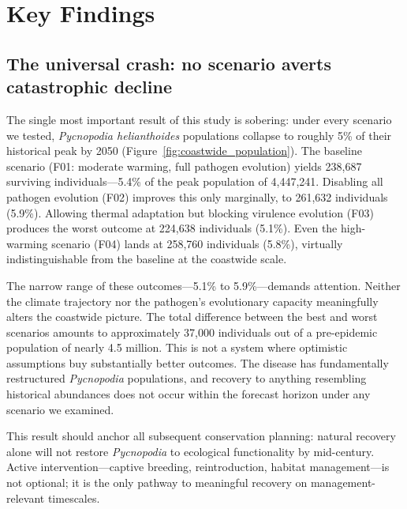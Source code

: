 
\section{Key Findings}
\label{sec:key_findings}

\subsection{The universal crash: no scenario averts catastrophic decline}
\label{sec:findings_crash}

The single most important result of this study is sobering: under every scenario we
tested, \textit{Pycnopodia helianthoides} populations collapse to roughly 5\% of their
historical peak by 2050 (Figure~\ref{fig:coastwide_population}). The baseline
scenario (F01: moderate warming, full pathogen evolution) yields 238,687 surviving
individuals---5.4\% of the peak population of 4,447,241. Disabling all pathogen
evolution (F02) improves this only marginally, to 261,632 individuals (5.9\%).
Allowing thermal adaptation but blocking virulence evolution (F03) produces the
worst outcome at 224,638 individuals (5.1\%). Even the high-warming scenario (F04)
lands at 258,760 individuals (5.8\%), virtually indistinguishable from the baseline
at the coastwide scale.

The narrow range of these outcomes---5.1\% to 5.9\%---demands attention. Neither the
climate trajectory nor the pathogen's evolutionary capacity meaningfully alters the
coastwide picture. The total difference between the best and worst scenarios amounts
to approximately 37,000 individuals out of a pre-epidemic population of nearly 4.5
million. This is not a system where optimistic assumptions buy substantially better
outcomes. The disease has fundamentally restructured \textit{Pycnopodia} populations,
and recovery to anything resembling historical abundances does not occur within
the forecast horizon under any scenario we examined.

This result should anchor all subsequent conservation planning: natural recovery
alone will not restore \textit{Pycnopodia} to ecological functionality by mid-century.
Active intervention---captive breeding, reintroduction, habitat management---is not
optional; it is the only pathway to meaningful recovery on management-relevant
timescales.

